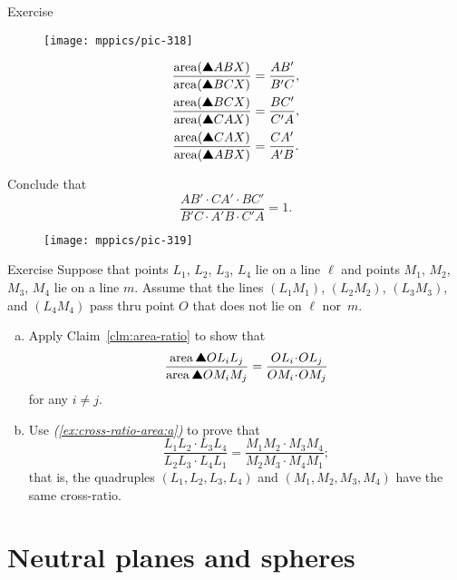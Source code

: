 {\begin{thm}{Exercise}
{

\begin{wrapfigure}[6]{r}{40 mm}
\vskip4mm
\centering
\texttt{[image: mppics/pic-318]}
\end{wrapfigure}

\begin{align*}
\frac{\area(\solidtriangle ABX)}{\area(\solidtriangle BCX)}&=\frac{AB'}{B'C},
\\
\frac{\area(\solidtriangle BCX)}{\area(\solidtriangle CAX)}&=\frac{BC'}{C'A},
\\
\frac{\area(\solidtriangle CAX)}{\area(\solidtriangle ABX)}&=\frac{CA'}{A'B} .
\end{align*}

}

Conclude that 
\[\frac{AB'\cdot CA'\cdot BC'}{B'C\cdot A'B\cdot C'A}=1.\]
\end{thm}

\begin{wrapfigure}[5]{r}{40 mm}
\vskip-6mm
\centering
\texttt{[image: mppics/pic-319]}
\end{wrapfigure}

\begin{thm}{Exercise}\label{ex:cross-ratio-area}
Suppose that points $L_1$, $L_2$, $L_3$, $L_4$ lie on a line $\ell$ 
and points $M_1$, $M_2$, $M_3$, $M_4$ lie on a line $m$. 
Assume that the lines $(L_1M_1)$, $(L_2M_2)$, $(L_3M_3)$, and $(L_4M_4)$ pass thru point $O$ that does not lie on $\ell$ nor~$m$.

\begin{enumerate}[(a)]
 \item\label{ex:cross-ratio-area:a} Apply Claim~\ref{clm:area-ratio} to show that
 \[\frac{\area\solidtriangle OL_iL_j}{\area\solidtriangle OM_iM_j}=\frac{OL_i\cdot OL_j}{OM_i\cdot OM_j}\]
 for any $i\ne j$.
 \item\label{ex:cross-ratio-area:b} Use \textit{(\ref{ex:cross-ratio-area:a})} to prove that 
 \[\frac{L_1L_2\cdot L_3L_4}{L_2L_3\cdot L_4L_1}=\frac{M_1M_2\cdot M_3M_4}{M_2M_3\cdot M_4M_1};\]
 that is, the quadruples $(L_1, L_2, L_3, L_4)$ and $(M_1, M_2, M_3, M_4)$ have the same cross-ratio.
 
\end{enumerate}

\end{thm}


\section{Neutral planes and spheres}

}

